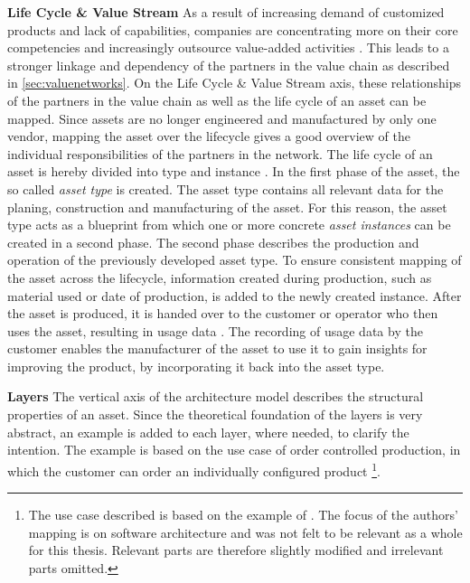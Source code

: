 \textbf{Life Cycle \& Value Stream} As a result of increasing demand of customized products and lack of capabilities, companies are concentrating more on their core competencies and increasingly outsource value-added activities \cite[p. 11]{Arnold2018DigitaleMittelstand}. This leads to a stronger linkage and dependency of the partners in the value chain as described in \ref{sec:valuenetworks}. On the Life Cycle \& Value Stream axis, these relationships of the partners in the value chain as well as the life cycle of an asset can be mapped. Since assets are no longer engineered and manufactured by only one vendor, mapping the asset over the lifecycle gives a good overview of the individual responsibilities of the partners in the network.  The life cycle of an asset is hereby divided into type and instance \cite[p. 43]{Heidel2017ReferenzarchitekturmodellIndustrie4.0Komponente}. In the first phase of the asset, the so called \textit{asset type} is created. The asset type contains all relevant data for the planing, construction and manufacturing of the asset. For this reason, the asset type acts as a blueprint from which one or more concrete \textit{asset instances} can be created in a second phase. The second phase describes the production and operation of the previously developed asset type. To ensure consistent mapping of the asset across the lifecycle, information created during production, such as material used or date of production, is added to the newly created instance. After the asset is produced, it is handed over to the customer or operator who then uses the asset, resulting in usage data \cite[p. 43]{Heidel2017ReferenzarchitekturmodellIndustrie4.0Komponente}. The recording of usage data by the customer enables the manufacturer of the asset to use it to gain insights for improving the product, by incorporating it back into the asset type.
    
\textbf{Layers} The vertical axis of the architecture model describes the structural properties of an asset. Since the theoretical foundation of the layers is very abstract, an example is added to each layer, where needed, to clarify the intention. The example is based on the use case of order controlled production, in which the customer can order an individually configured product \footnote{The use case described is based on the example of \citet[p. 39 - 41]{Anderl2016Softwarearchitekturen4.0}. The focus of the authors' mapping is on software architecture and was not felt to be relevant as a whole for this thesis. Relevant parts are therefore slightly modified and irrelevant parts omitted.}. 
    

